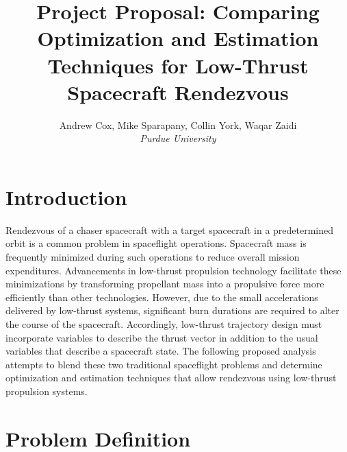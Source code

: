 \documentclass[a4paper]{article}
\title{Project Proposal: Comparing Optimization and Estimation Techniques for Low-Thrust Spacecraft Rendezvous}
\author{Andrew Cox, Mike Sparapany, Collin York, Waqar Zaidi \\\textit{Purdue University}}
\date{}	%
\begin{document}
\maketitle


\section{Introduction}
Rendezvous of a chaser spacecraft with a target spacecraft in a predetermined orbit is a common problem in spaceflight operations. Spacecraft mass is frequently minimized during such operations to reduce overall mission expenditures. Advancements in low-thrust propulsion technology facilitate these minimizations by transforming propellant mass into a propulsive force more efficiently than other technologies. However, due to the small accelerations delivered by low-thrust systems, significant burn durations are required to alter the course of the spacecraft. Accordingly, low-thrust trajectory design must incorporate variables to describe the thrust vector in addition to the usual variables that describe a spacecraft state. The following proposed analysis attempts to blend these two traditional spaceflight problems and determine optimization and estimation techniques that allow rendezvous using low-thrust propulsion systems.

\section{Problem Definition}
\end{document}
